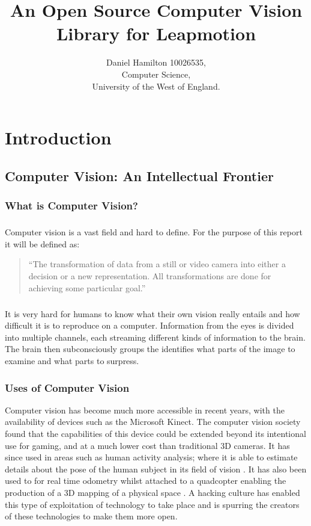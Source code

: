 \documentclass[12pt,a4paper]{report}
\title{An Open Source Computer Vision Library for Leapmotion}
\author{Daniel Hamilton 10026535,\\Computer Science,\\University of the West of England.}
\begin{document}
	\maketitle
	\tableofcontents
	\begin{abstract}
	
	\end{abstract}	
	
	\chapter{Introduction}
		\section{Computer Vision: An Intellectual Frontier}
			\subsection{What is Computer Vision?}
				\paragraph{}
Computer vision is a vast field and hard to define.
For the purpose of this report it will be defined as:
	
				\begin{quote}
``The transformation of data from a still or video camera into either a decision or a new representation.
All transformations are done for achieving some particular goal.''\\\cite{cvDef}
				\end{quote}
		
				\paragraph{}
It is very hard for humans to know what their own vision really entails and how difficult it is to reproduce on a computer.
Information from the eyes is divided into multiple channels, each streaming different kinds of information to the brain.
The brain then subconsciously groups the identifies what parts of the image to examine and what parts to surpress.

			\subsection{Uses of Computer Vision}
Computer vision has become much more accessible in recent years, with the availability of devices such as the Microsoft Kinect.
The computer vision society found that the capabilities of this device could be extended beyond its intentional use for gaming, and at a much lower cost than traditional 3D cameras.
It has since used in areas such as human activity analysis; where it is able to estimate details about the pose of the human subject in its field of vision \cite{kinect:1}.
It has also been used to for real time odometry whilst attached to a quadcopter enabling the production of a 3D mapping of a physical space \cite{kinect:2}.
A hacking culture has enabled this type of exploitation of technology to take place and is spurring the creators of these technologies to make them more open.
		
\end{document}
